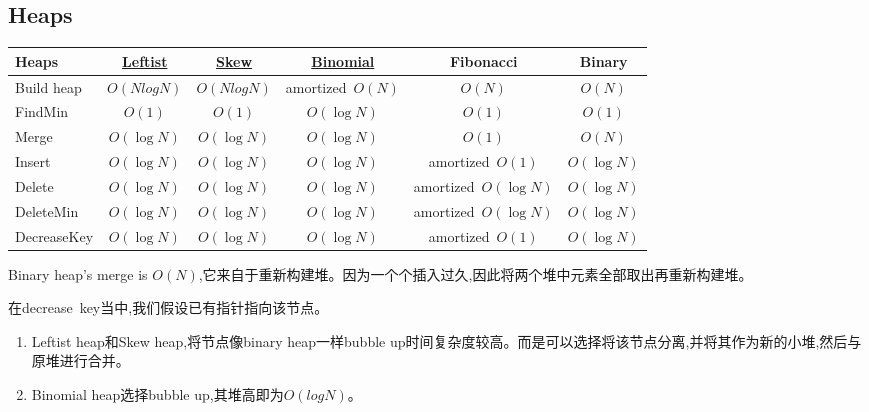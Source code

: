 \documentclass{article}
\begin{document}
\subsection{Heaps}
\begin{table}[htbp] 
    \centering
    \begin{tabular}[c]{|l|c|c|c|c|c|}\hline 
        Heaps & \hyperlink{Leftist}{Leftist} & \hyperlink{Skew}{Skew} & \hyperlink{Binomial}{Binomial} & Fibonacci & Binary\\ \hline 
        Build heap & $O(Nlog N)$ & $O(Nlog N)$ & amortized\ $O(N)$ & $O(N)$ & $O(N)$\\ \hline 
        FindMin & $O(1)$ & $O(1)$ & $O(\log N)$ & $O(1)$ & $O(1)$\\ \hline 
        Merge & $O(\log N)$ & $O(\log N)$ & $O(\log N)$ & $O(1)$ & $O(N)$\\ \hline 
        Insert & $O(\log N)$ & $O(\log N)$ & $O(\log N)$ & amortized\ $O(1)$ & $O(\log N)$\\ \hline 
        Delete & $O(\log N)$ & $O(\log N)$ & $O(\log N)$ & amortized\ $O(\log N)$ & $O(\log N)$\\ \hline 
        DeleteMin & $O(\log N)$ & $O(\log N)$ & $O(\log N)$ & amortized\ $O(\log N)$ & $O(\log N)$\\ \hline 
        DecreaseKey & $O(\log N)$ & $O(\log N)$ & $O(\log N)$ & amortized\ $O(1)$ & $O(\log N)$\\ \hline 
    \end{tabular} 
\end{table}

Binary heap's merge is $O(N)$,它来自于重新构建堆。因为一个个插入过久,因此将两个堆中元素全部取出再重新构建堆。
\par
在decrease\ key当中,我们假设已有指针指向该节点。\par
\begin{enumerate}
    \item Leftist heap和Skew heap,将节点像binary heap一样bubble up时间复杂度较高。而是可以选择将该节点分离,并将其作为新的小堆,然后与原堆进行合并。
    \item Binomial heap选择bubble up,其堆高即为$O(log N)$。
\end{enumerate}
\end{document}

